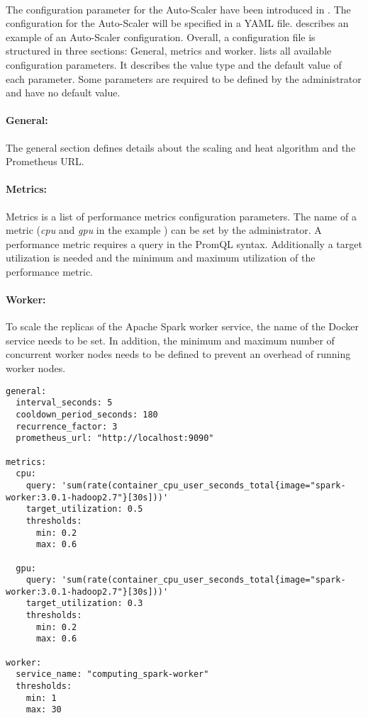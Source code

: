 \paragraph{}The configuration parameter for the Auto-Scaler have been introduced in .
The configuration for the Auto-Scaler will be specified in a YAML file.
 describes an example of an Auto-Scaler configuration.
Overall, a configuration file is structured in three sections: General, metrics and worker.
 lists all available configuration parameters. It describes the value type and the default value of each parameter. Some parameters are required to be defined by the administrator and have no default value.

\paragraph{General:}
The general section defines details about the scaling and heat algorithm and the Prometheus URL.


\paragraph{Metrics:}
Metrics is a list of performance metrics configuration parameters. The name of a metric (\textit{cpu} and \textit{gpu} in the example ) can be set by the administrator. A performance metric requires a query in the PromQL syntax. Additionally a target utilization is needed and the minimum and maximum utilization of the performance metric.


\paragraph{Worker:}
To scale the replicas of the Apache Spark worker service, the name of the Docker service needs to be set. In addition, the minimum and maximum number of concurrent worker nodes needs to be defined to prevent an overhead of running worker nodes.


\begin{lstlisting}[label=lst:06_auto-scaler_config_example, caption=Auto-Scaler configuration YAML file]
general:
  interval_seconds: 5
  cooldown_period_seconds: 180
  recurrence_factor: 3
  prometheus_url: "http://localhost:9090"
 
metrics:
  cpu:
    query: 'sum(rate(container_cpu_user_seconds_total{image="spark-worker:3.0.1-hadoop2.7"}[30s]))'
    target_utilization: 0.5
    thresholds:
      min: 0.2
      max: 0.6
  
  gpu:
    query: 'sum(rate(container_cpu_user_seconds_total{image="spark-worker:3.0.1-hadoop2.7"}[30s]))'
    target_utilization: 0.3
    thresholds:
      min: 0.2
      max: 0.6
 
worker:
  service_name: "computing_spark-worker"
  thresholds:
    min: 1
    max: 30
\end{lstlisting}


